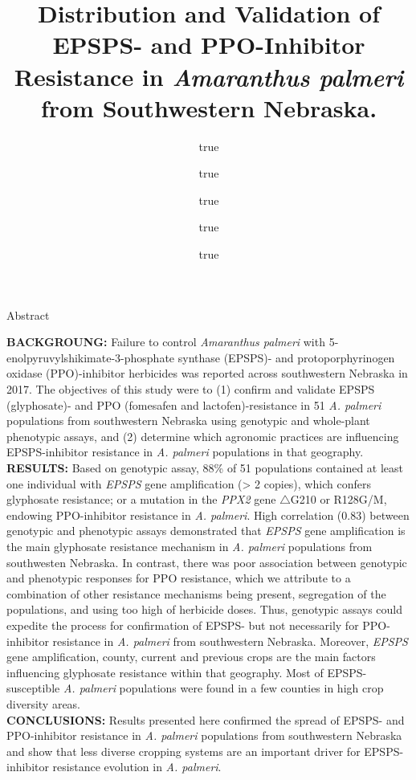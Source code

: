 \documentclass[
  12pt,
  a4paper]{article}
\title{Distribution and Validation of EPSPS- and PPO-Inhibitor Resistance in
\emph{Amaranthus palmeri} from Southwestern Nebraska.}
\author{true \and true \and true \and true \and true}
\date{}
\begin{document}
\maketitle

\vspace{2mm}

\doublespace

\large Abstract

\textbf{BACKGROUNG:} Failure to control \textit{Amaranthus palmeri} with
5-enolpyruvylshikimate-3-phosphate synthase (EPSPS)- and
protoporphyrinogen oxidase (PPO)-inhibitor herbicides was reported
across southwestern Nebraska in 2017. The objectives of this study were
to (1) confirm and validate EPSPS (glyphosate)- and PPO (fomesafen and
lactofen)-resistance in 51 \textit{A. palmeri} populations from
southwestern Nebraska using genotypic and whole-plant phenotypic assays,
and (2) determine which agronomic practices are influencing
EPSPS-inhibitor resistance in \textit{A. palmeri} populations in that
geography.\\
\textbf{RESULTS:} Based on genotypic assay, 88\% of 51 populations
contained at least one individual with \textit{EPSPS} gene amplification
(\textgreater{} 2 copies), which confers glyphosate resistance; or a
mutation in the \textit{PPX2} gene \(\triangle\)G210 or R128G/M,
endowing PPO-inhibitor resistance in \textit{A. palmeri}. High
correlation (0.83) between genotypic and phenotypic assays demonstrated
that \textit{EPSPS} gene amplification is the main glyphosate resistance
mechanism in \textit{A. palmeri} populations from southwesten Nebraska.
In contrast, there was poor association between genotypic and phenotypic
responses for PPO resistance, which we attribute to a combination of
other resistance mechanisms being present, segregation of the
populations, and using too high of herbicide doses. Thus, genotypic
assays could expedite the process for confirmation of EPSPS- but not
necessarily for PPO-inhibitor resistance in \textit{A. palmeri} from
southwestern Nebraska. Moreover, \textit{EPSPS} gene amplification,
county, current and previous crops are the main factors influencing
glyphosate resistance within that geography. Most of EPSPS-susceptible
\textit{A. palmeri} populations were found in a few counties in high
crop diversity areas.\\
\textbf{CONCLUSIONS:} Results presented here confirmed the spread of
EPSPS- and PPO-inhibitor resistance in \textit{A. palmeri} populations
from southwestern Nebraska and show that less diverse cropping systems
are an important driver for EPSPS-inhibitor resistance evolution in
\textit{A. palmeri}.
\end{document}
